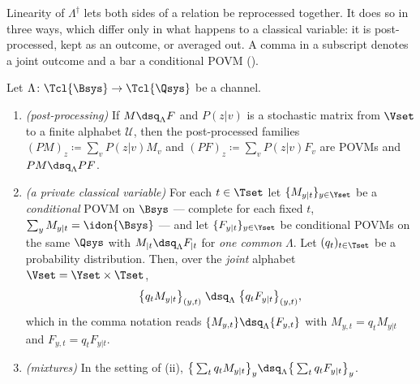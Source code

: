 
Linearity of $\Lambda^{\dagger}$ lets both sides of a relation be reprocessed
together. It does so in three ways, which differ only in what happens to a
classical variable: it is post-processed, kept as an outcome, or averaged out.
A comma in a subscript denotes a joint outcome and a bar a conditional POVM
().

\begin{lemma}\label{lem:linear}
Let $\Lambda\colon\Tcl{\Bsys}\to\Tcl{\Qsys}$ be a channel.
\begin{enumerate}[label=(\roman*),leftmargin=3.0em]
\item \emph{(post-processing)} If $M\dsq_{\Lambda}F$ and $P(z|v)$ is a
  stochastic matrix from $\Vset$ to a finite alphabet $\mathcal{U}$, then the
  post-processed families $(PM)_z\coloneqq\sum_vP(z|v)M_v$ and
  $(PF)_z\coloneqq\sum_vP(z|v)F_v$ are POVMs and
  $PM\dsq_{\Lambda}PF$.
\item \emph{(a private classical variable)} For each $t\in\Tset$ let
  $\{M_{y|t}\}_{y\in\Yset}$ be a \emph{conditional} POVM on $\Bsys$ ---
  complete for each fixed $t$, $\sum_yM_{y|t}=\idon{\Bsys}$ --- and let
  $\{F_{y|t}\}_{y\in\Yset}$ be conditional POVMs
  on the same $\Qsys$ with $M_{|t}\dsq_{\Lambda}F_{|t}$ for \emph{one common}
  $\Lambda$. Let $(q_t)_{t\in\Tset}$ be a probability distribution. Then, over
  the \emph{joint} alphabet $\Vset=\Yset\times\Tset$,
  \begin{equation}\label{eq:private}
    \big\{q_tM_{y|t}\big\}_{(y,t)}\;\dsq_{\Lambda}\;
    \big\{q_tF_{y|t}\big\}_{(y,t)} ,
  \end{equation}
  which in the comma notation reads
  $\{M_{y,t}\}\dsq_{\Lambda}\{F_{y,t}\}$ with $M_{y,t}=q_tM_{y|t}$ and
  $F_{y,t}=q_tF_{y|t}$.
\item \emph{(mixtures)} In the setting of (ii),
  $\big\{\sum_tq_tM_{y|t}\big\}_y\dsq_{\Lambda}
   \big\{\sum_tq_tF_{y|t}\big\}_y$.
\end{enumerate}
\end{lemma}

